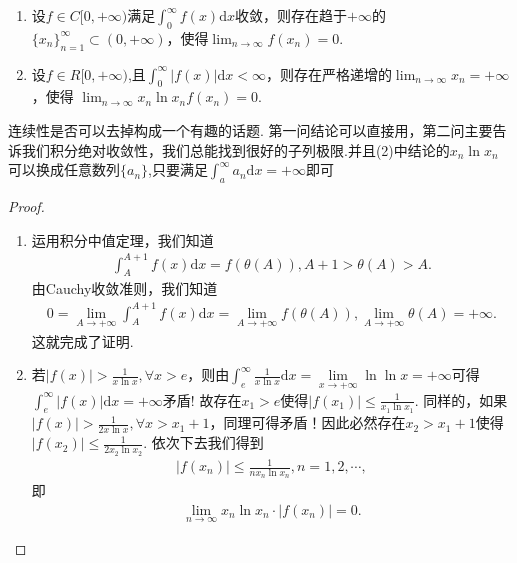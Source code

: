 \documentclass[../../main.tex]{subfiles}%
\begin{document}
\begin{proposition}[积分收敛必有子列趋于0]\label{proposition:积分收敛必有子列趋于0}
\begin{enumerate}[(1)]
\item 设$f\in C[0,+\infty)$满足$\int_{0}^{\infty}f(x)\mathrm{d}x$收敛，则存在趋于$+\infty$的$\{x_n\}_{n = 1}^{\infty}\subset(0,+\infty)$，使得$\lim_{n\to\infty}f(x_n)=0$.

\item 设$f\in R[0,+\infty)$,且$\int_{0}^{\infty}|f(x)|\mathrm{d}x < \infty$，则存在严格递增的$\lim_{n\to\infty}x_n = +\infty$，使得
$\lim_{n\to\infty}x_n\ln x_nf(x_n)=0$.
\end{enumerate}
\end{proposition}
\begin{note}
连续性是否可以去掉构成一个有趣的话题. 第一问结论可以直接用，第二问主要告诉我们积分绝对收敛性，我们总能找到很好的子列极限.并且(2)中结论的$x_n \ln x_n$可以换成任意数列$\{a_n\}$,只要满足$\int_{a}^{\infty}a_n\mathrm{d}x=+\infty$即可
\end{note}
\begin{proof}
\begin{enumerate}[(1)]
\item 运用积分中值定理，我们知道
\begin{align*}
\int_{A}^{A + 1}f(x)\mathrm{d}x = f(\theta(A)), A + 1 > \theta(A) > A.
\end{align*}
由Cauchy收敛准则，我们知道
\begin{align*}
0 = \lim_{A\to +\infty}\int_{A}^{A + 1}f(x)\mathrm{d}x = \lim_{A\to +\infty}f(\theta(A)), \lim_{A\to +\infty}\theta(A) = +\infty.
\end{align*}
这就完成了证明.

\item 若$|f(x)| > \frac{1}{x\ln x}, \forall x > e$，则由$\int_e^{\infty}{\frac{1}{x\ln x}\mathrm{d}x}=\underset{x\rightarrow +\infty}{\lim}\ln\ln x=+\infty $可得$\int_e^{\infty}{\left| f\left( x \right) \right|\mathrm{d}x}=+\infty $矛盾! 故存在$x_1 > e$使得$|f(x_1)| \leqslant \frac{1}{x_1\ln x_1}$.
同样的，如果$|f(x)| > \frac{1}{2x\ln x}, \forall x > x_1 + 1$，同理可得矛盾！因此必然存在$x_2 > x_1 + 1$使得$|f(x_2)| \leqslant \frac{1}{2x_2\ln x_2}$. 依次下去我们得到
\begin{align*}
|f(x_n)| \leqslant \frac{1}{nx_n\ln x_n}, n = 1,2,\cdots,
\end{align*}
即
\begin{align*}
\lim_{n\to\infty}x_n\ln x_n\cdot|f(x_n)| = 0.
\end{align*} 
\end{enumerate}
\end{proof}
\end{document}
